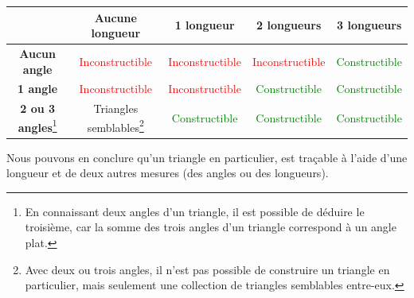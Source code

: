 \documentclass[a4paper]{article}
\begin{document}
			\begin{center}
					\renewcommand{\arraystretch}{1.25}
					\begin{tabular}{|c|c|c|c|c|}
						\hline
									           & \textbf{Aucune longueur}         & \textbf{1 longueur}              & \textbf{2 longueurs}             & \textbf{3 longueurs}             \\
						\hline
						\textbf{Aucun angle}   & \textcolor{Red}{Inconstructible} & \textcolor{Red}{Inconstructible} & \textcolor{Red}{Inconstructible} & \textcolor{Green}{Constructible} \\
						\hline
						\textbf{1 angle}       & \textcolor{Red}{Inconstructible} & \textcolor{Red}{Inconstructible} & \textcolor{Green}{Constructible} & \textcolor{Green}{Constructible} \\
						\hline
						\textbf{2 ou 3 angles}\footnote{
							En connaissant deux angles d'un triangle, 
							il est possible de déduire le troisième, 
							car la somme des trois angles d'un triangle 
							correspond à un angle plat.
											} & Triangles semblables\footnote{
											Avec deux ou trois angles, 
											il n'est pas possible de construire un triangle en particulier,
											mais seulement une collection de triangles semblables entre-eux.
										}& \textcolor{Green}{Constructible} & \textcolor{Green}{Constructible} & \textcolor{Green}{Constructible} \\
						\hline
					\end{tabular}
			\end{center}

			Nous pouvons en conclure qu'un triangle en particulier, 
			est traçable à l'aide d'une longueur et de deux autres mesures 
			(des angles ou des longueurs).
\end{document}

